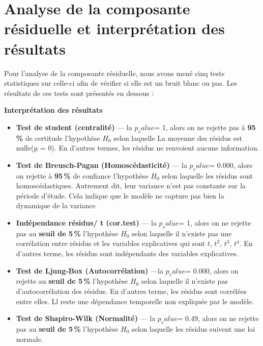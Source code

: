 \documentclass[
12pt,          %
a4paper,       %
oneside,       %
openright      %
]{report}
\begin{document}
 
 
 \section{ Analyse de la composante résiduelle et interprétation des résultats}
 
 Pour l'analyse de la composante résiduelle, nous avons mené cinq tests statistiques sur celle-ci afin de vérifier si elle est un bruit blanc ou pas. 
 Les résultats de ces tests sont présentés en dessous : 
 
 
 \begin{table}[H]
 	\centering
 	
 	\caption{Les coefficients de la régression polynomiale}
 	\label{tab:resultats_tests_polynomiale}
 \end{table}
 
 \textbf{ Interprétation des résultats}
 
 
 
 \begin{itemize}
 	\item \textbf{Test de student (centralité)} --- la \textbf{$p_value$}= 1, alors on ne rejette pas  à \textbf{ 95\,\%} de certitude l'hypothèse $H_0$  selon laquelle La moyenne des résidus est nulle(µ = 0). En d'autres termes, les résidus ne renvoient aucune information.
 	
 	\item \textbf{Test de Breusch-Pagan (Homoscédasticité)} --- la \textbf{$p_value$}= 0.000, alors on rejette à \textbf{ 95\,\%} de confiance l'hypothèse $H_0$ selon laquelle les résidus sont homoscédastiques. Autrement dit, leur variance n'est pas constante sur la période d'étude.
 	 Cela indique que le modèle ne capture pas bien la dynamique de la variance 
 	
 	\item \textbf{Indépendance résidus/ t (cor.test)} --- la \textbf{$p_value$}= 1, alors on ne rejette pas  au \textbf{ seuil de 5\,\%} l'hypothèse $H_0$ selon laquelle il n'existe pas une corrélation entre résidus et les variables explicatives qui sont $t$, $t^2$, $t^3$, $t^4$.
 	En d'autres terme, les résidus sont indépendants des variables explicatives.
 	
 	
 	\item \textbf{Test de Ljung-Box (Autocorrélation)} ---la \textbf{$p_value$}= 0.000, alors on rejette au \textbf{ seuil de 5\,\%} l'hypothèse $H_0$ selon laquelle il n'existe pas d'autocorrélation des résidus.
 	En d'autres terme, les résidus sont corrélées entre elles. Ll reste une dépendance temporelle non expliquée par le modèle.
 	
 	\item \textbf{Test de Shapiro-Wilk (Normalité)} --- la \textbf{$p_value$}= 0.49, alors on ne rejette pas au \textbf{ seuil de 5\,\%} l'hypothèse $H_0$ selon laquelle les résidus suivent une loi normale. 
 \end{itemize}
 
\end{document}
